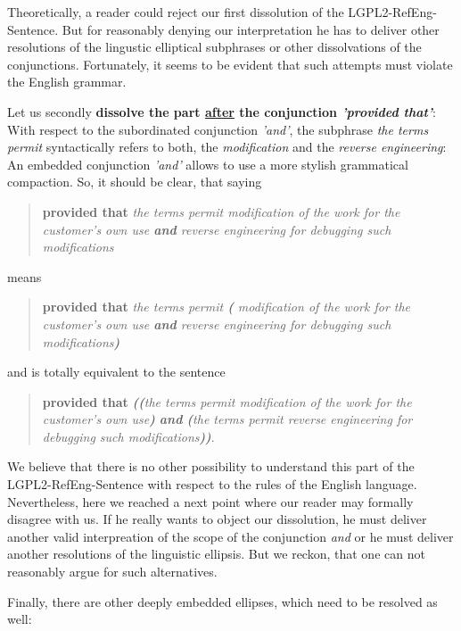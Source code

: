 Theoretically, a reader could reject our first dissolution of the
LGPL2-RefEng-Sentence. But for reasonably denying our interpretation he has to
deliver other resolutions of the lingustic elliptical subphrases or other
dissolvations of the conjunctions. Fortunately, it seems to be evident that such
attempts must violate the English grammar.

Let us secondly \textbf{dissolve the part \underline{after} the conjunction
\emph{'provided that'}}: With respect to the subordinated conjunction
\emph{'and'}, the subphrase \emph{the terms permit} syntactically refers to
both, the \emph{modification} and the \emph{reverse engineering}: An embedded
conjunction \emph{'and'} allows to use a more stylish grammatical compaction.
So, it should be clear, that saying

\begin{quote}\noindent\textbf{provided that} \emph{the terms permit modification
of the work for the customer's own use \emph{\textbf{and}} reverse engineering
for debugging such modifications}\end{quote}

means

\begin{quote}\noindent\textbf{provided that} \emph{the terms permit
\textbf{(} modification of the work for the customer's own use \emph{\textbf{and}}
reverse engineering for debugging such modifications\textbf{)}}\end{quote}

and is totally equivalent to the sentence 

\begin{quote}\noindent[\ldots] \textbf{provided that} \emph{\textbf{((}the terms
permit modification of the work for the customer's own use\textbf{)}
\emph{\textbf{and}} \textbf{(}the terms permit reverse engineering for debugging
such modifications\textbf{))}}.
\end{quote}

We believe that there is no other possibility to understand this part of the
LGPL2-RefEng-Sentence with respect to the rules of the English language.
Nevertheless, here we reached a next point where our reader may formally
disagree with us. If he really wants to object our dissolution, he must deliver
another valid interpreation of the scope of the conjunction \emph{and} or he
must deliver another resolutions of the linguistic ellipsis. But we reckon, that
one can not reasonably argue for such alternatives.

Finally, there are other deeply embedded ellipses, which need to be resolved
as well:

